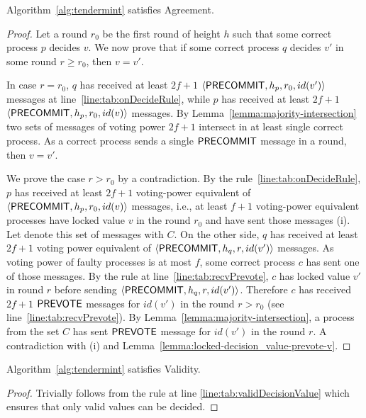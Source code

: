 \begin{lemma}
	\label{lemma:agreement}
	Algorithm~\ref{alg:tendermint} satisfies Agreement. 
\end{lemma}

\begin{proof}
Let a round $r_0$ be the first round of height $h$ such that some correct process $p$ decides $v$. We now prove that if some correct process $q$ decides $v'$ in some round $r \ge r_0$, then $v = v'$.

In case $r = r_0$, $q$ has received at least $2f+1$ $\langle\mathsf{PRECOMMIT},h_p,r_0,id(v')\rangle$  messages at line~\ref{line:tab:onDecideRule},
while $p$ has received at least $2f+1$ $\langle\mathsf{PRECOMMIT},h_p,r_0,id(v)\rangle$ messages. 
By Lemma~\ref{lemma:majority-intersection} two sets of messages of voting power $2f+1$ intersect in at least single correct process.
As a correct process sends a single $\mathsf{PRECOMMIT}$ message in a round, then $v=v'$.

We prove the case $r > r_0$ by a contradiction. By the rule~\ref{line:tab:onDecideRule}, $p$ has received at least $2f+1$ voting-power equivalent of $\langle\mathsf{PRECOMMIT},h_p,r_0,id(v)\rangle$ messages, i.e., at least $f+1$ voting-power equivalent processes 
have locked value $v$ in the round $r_0$ and have sent those messages (i). Let denote this set of messages with $C$.
On the other side, $q$ has received at least $2f+1$ voting power equivalent of $\langle\mathsf{PRECOMMIT},h_q, r,id(v')\rangle$ messages. As voting power of faulty processes is at most $f$, some correct process $c$ has sent one of those messages. By the rule at line~\ref{line:tab:recvPrevote}, $c$ has locked value $v'$ in round $r$ before sending $\langle\mathsf{PRECOMMIT},h_q, r,id(v')\rangle$. Therefore $c$ has received $2f+1$ $\mathsf{PREVOTE}$ messages for $id(v')$ in the round $r > r_0$ (see line~\ref{line:tab:recvPrevote}). By Lemma~\ref{lemma:majority-intersection}, a process from the set $C$ has sent $\mathsf{PREVOTE}$ message for $id(v')$ in the round $r$. 
A contradiction with (i) and Lemma~\ref{lemma:locked-decision_value-prevote-v}.  
\end{proof}	

\begin{lemma}
	\label{lemma:agreement}
	Algorithm~\ref{alg:tendermint} satisfies Validity. 
\end{lemma}

\begin{proof}
Trivially follows from the rule at line \ref{line:tab:validDecisionValue} which ensures that only valid values can be decided. 
\end{proof}	

